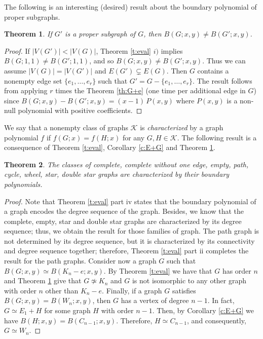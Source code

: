 \documentclass[review]{elsarticle}
\newtheorem{theorem}{Theorem}[section]
\begin{document}
The following is an interesting (desired) result about the boundary polynomial of proper subgraphs.

\begin{theorem}\label{t:subgraph}
If $G'$ is a proper subgraph of $G$, then $B(G;x,y)\neq B(G';x,y)$.
\end{theorem}

\begin{proof}
If  $|V(G')|<|V(G)|$, Theorem \ref{t:eval} $i)$ implies $B(G;1,1)\neq B(G';1,1)$, and so
$B(G;x,y)\neq B(G';x,y)$. Thus we can assume $|V(G)|=|V(G')|$ and
$E(G')\subsetneq E(G)$. Then $G$ contains a nonempty edge set $\{e_1,\ldots,e_r\}$ such that
 $G'=G-\{e_1,\ldots,e_r\}$. The result
follows from applying $r$ times the Theorem \ref{th:G+e} (one time per additional edge in $G$) since $B(G;x,y)- B(G';x,y)= (x-1)\,P(x,y)$ where $P(x,y)$ is a non-null polynomial with positive coefficients.
\end{proof}

We say that a nonempty class of graphs $\mathcal K$ is {\em characterized} by a graph polynomial $f$ if
$f(G;x) = f(H;x)$ for any $G,H\in \mathcal K$.  
The following result is a consequence of Theorem \ref{t:eval}, Corollary \ref{c:E+G} and Theorem \ref{t:subgraph}.

\begin{theorem}\label{t:Kn+En+Kn-e}
  The classes of complete, complete without one edge, empty, path, cycle, wheel, star, double star graphs are characterized by their boundary polynomials.
\end{theorem}


\begin{proof}
    Note that Theorem \ref{t:eval} part iv states that the boundary polynomial of a graph encodes the degree sequence of the graph. Besides, we know that the complete, empty, star and double star graphs are characterized by its degree sequence; thus, we obtain the result for those families of graph.
    The path graph is not determined by its degree sequence, but it is characterized by its connectivity and degree sequence together; therefore, Theorem \ref{t:eval} part ii completes the result for the path graphs. 
    Consider now a graph $G$ such that $B(G;x,y)\simeq B(K_n-e;x,y)$. By Theorem \ref{t:eval} we have that $G$ has order $n$ and Theorem \ref{t:subgraph} give that $G\not\simeq K_n$ and $G$ is not isomorphic to any other graph with order $n$ other than $K_n-e$. 
    Finally, if a graph $G$ satisfies $B(G;x,y)=B(W_n;x,y)$, then $G$ has a vertex of degree $n-1$. In fact, $G\simeq E_1+H$ for some graph $H$ with order $n-1$. Then, by Corollary \ref{c:E+G} we have $B(H;x,y)=B(C_{n-1};x,y)$. Therefore, $H\simeq C_{n-1}$, and consequently, $G\simeq W_n$.
\end{proof}
\end{document}
